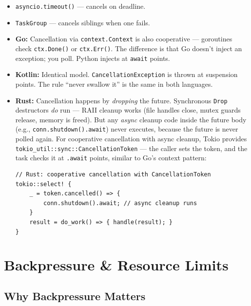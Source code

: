 \documentclass[11pt,a4paper,oneside]{book}
\newcommand{\py}[1]{\texttt{\color{pyblue}#1}}
\newcommand{\gocode}[1]{\texttt{\color{goblue}#1}}
\newcommand{\javacode}[1]{\texttt{\color{javaorange!80!black}#1}}
\begin{document}
\begin{itemize}
    \item \py{asyncio.timeout()} --- cancels on deadline.
    \item \py{TaskGroup} --- cancels siblings when one fails.
\end{itemize}

\begin{analogybox}
\begin{itemize}
    \item \textcolor{goblue}{\textbf{Go:}} Cancellation via \gocode{context.Context} is also
          cooperative --- goroutines check \texttt{ctx.Done()} or \texttt{ctx.Err()}. The difference
          is that Go doesn't inject an exception; you poll. Python injects at \py{await} points.
    \item \textcolor{javaorange}{\textbf{Kotlin:}} Identical model. \javacode{CancellationException}
          is thrown at suspension points. The rule ``never swallow it'' is the same in both languages.
    \item \textcolor{BrickRed}{\textbf{Rust:}} Cancellation happens by \emph{dropping} the future.
          Synchronous \texttt{Drop} destructors \emph{do} run --- RAII cleanup works
          (file handles close, mutex guards release, memory is freed). But any \emph{async}
          cleanup code inside the future body (e.g., \texttt{conn.shutdown().await}) never executes,
          because the future is never polled again.
          For cooperative cancellation with async cleanup, Tokio provides
          \texttt{tokio\_util::sync::CancellationToken} --- the caller sets the token, and the
          task checks it at \texttt{.await} points, similar to Go's context pattern:
\begin{lstlisting}[style=rust,numbers=none]
// Rust: cooperative cancellation with CancellationToken
tokio::select! {
    _ = token.cancelled() => {
        conn.shutdown().await; // async cleanup runs
    }
    result = do_work() => { handle(result); }
}
\end{lstlisting}
\end{itemize}
\end{analogybox}

\chapter{Backpressure \& Resource Limits}

\section{Why Backpressure Matters}
\end{document}
